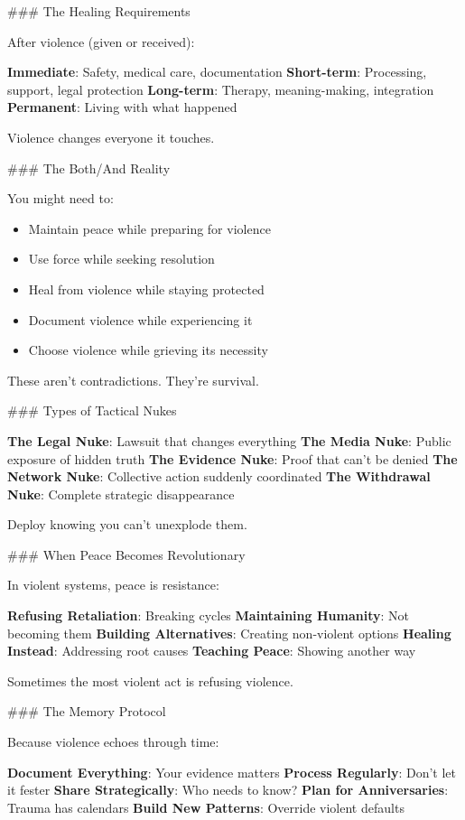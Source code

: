 \documentclass[12pt]{book}
\begin{document}
\#\#\# The Healing Requirements

After violence (given or received):

\textbf{Immediate}: Safety, medical care, documentation
\textbf{Short-term}: Processing, support, legal protection
\textbf{Long-term}: Therapy, meaning-making, integration
\textbf{Permanent}: Living with what happened

Violence changes everyone it touches.

\#\#\# The Both/And Reality

You might need to:
\begin{itemize}
\item Maintain peace while preparing for violence
\item Use force while seeking resolution
\item Heal from violence while staying protected
\item Document violence while experiencing it
\item Choose violence while grieving its necessity

\end{itemize}
These aren't contradictions. They're survival.

\#\#\# Types of Tactical Nukes

\textbf{The Legal Nuke}: Lawsuit that changes everything
\textbf{The Media Nuke}: Public exposure of hidden truth
\textbf{The Evidence Nuke}: Proof that can't be denied
\textbf{The Network Nuke}: Collective action suddenly coordinated
\textbf{The Withdrawal Nuke}: Complete strategic disappearance

Deploy knowing you can't unexplode them.

\#\#\# When Peace Becomes Revolutionary

In violent systems, peace is resistance:

\textbf{Refusing Retaliation}: Breaking cycles
\textbf{Maintaining Humanity}: Not becoming them
\textbf{Building Alternatives}: Creating non-violent options
\textbf{Healing Instead}: Addressing root causes
\textbf{Teaching Peace}: Showing another way

Sometimes the most violent act is refusing violence.

\#\#\# The Memory Protocol

Because violence echoes through time:

\textbf{Document Everything}: Your evidence matters
\textbf{Process Regularly}: Don't let it fester
\textbf{Share Strategically}: Who needs to know?
\textbf{Plan for Anniversaries}: Trauma has calendars
\textbf{Build New Patterns}: Override violent defaults
\end{document}
